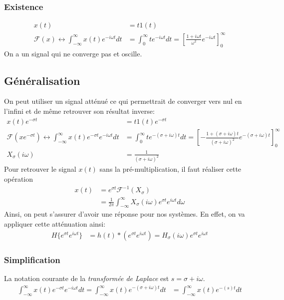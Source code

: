\documentclass{report}
\begin{document}
\subsubsection{Existence}
\begin{align*}
x(t) &= t 1(t)\\
\mathcal{F} (x) \longleftrightarrow \int_{-\infty}^{\infty} x(t) e^{-i \omega t} dt &= \int_0^{\infty} t e^{-i \omega t} dt = \left[ \frac{1 + i \omega t}{\omega^2} e^{-i \omega t} \right]_0^{\infty}
\end{align*}
On a un signal qui ne converge pas et oscille.

\subsection{Généralisation}
On peut utiliser un signal atténué ce qui permettrait de converger vers nul en l'infini et de même retrouver son résultat inverse:
\begin{align*}
x(t)e^{- \sigma t } &= t 1(t) e^{- \sigma t}\\
\mathcal{F} (x e^{- \sigma t}) \longleftrightarrow \int_{-\infty}^{\infty} x(t) e^{- \sigma t} e^{-i \omega t} dt &= \int_0^{\infty} t e^{-(\sigma + i \omega ) t} dt = \left[- \frac{1 + (\sigma + i \omega) t}{(\sigma + i \omega)^2} e^{-(\sigma + i \omega )t} \right]_0^{\infty}\\
X_{\sigma} (i \omega) &= \frac{1}{(\sigma + i \omega)^2}
\end{align*}
Pour retrouver le signal $x(t)$ sans la pré-multiplication, il faut réaliser cette opération
\begin{align*}
x(t) &= e^{\sigma t} \mathcal{F}^{-1} (X_{\sigma})\\
&= \frac{1}{2 \pi }\int_{-\infty}^{\infty} X_{\sigma} (i \omega) e^{\sigma t} e^{i \omega t} d\omega
\end{align*}
Ainsi, on peut s'assurer d'avoir une réponse pour nos systèmes. En effet, on va appliquer cette atténuation ainsi:
\begin{align*}
H\{e^{\sigma t} e^{i \omega t} \} &= h(t) \ast (e^{\sigma t} e^{i \omega t}) = H_{\sigma} (i \omega) e^{\sigma t} e^{i \omega t}
\end{align*}

\subsubsection{Simplification}
La notation courante de la \textit{transformée de Laplace} est $s = \sigma + i \omega$.
\begin{align*}
\int_{-\infty}^{\infty} x(t) e^{- \sigma t} e^{-i \omega t} dt = \int_{-\infty}^{\infty} x(t) e^{-( \sigma + i \omega) t} dt &= \int_{-\infty}^{\infty} x(t) e^{-( s) t} dt
\end{align*}
\end{document}
